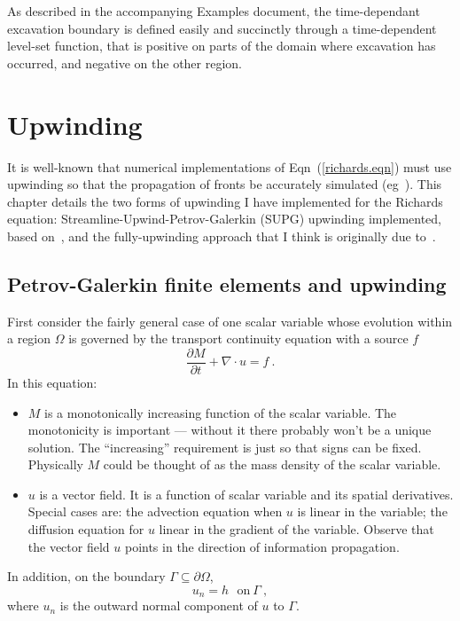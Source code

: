 \documentclass[]{scrreprt}
\begin{document}
As described in the accompanying Examples document, the time-dependant
excavation boundary is defined easily and succinctly through a time-dependent
level-set function, that is positive on parts of the domain where
excavation has occurred, and negative on the other region.




\chapter{Upwinding}
\label{chap.upwinding}

It is well-known that numerical implementations of
Eqn~(\ref{richards.eqn}) must use upwinding so that the propagation of
fronts be accurately simulated
(eg~\cite{huyakorn1978,dalen1979,helmig1998}).  This chapter details
the two forms of upwinding I have implemented for the Richards
equation: Streamline-Upwind-Petrov-Galerkin (SUPG) upwinding
implemented, based on~\cite{brooks1982, hughes1986}, and the
fully-upwinding approach that I think is originally due to~\cite{dalen1979}.

\section{Petrov-Galerkin finite elements and upwinding}

First consider the
fairly general case of one scalar variable whose evolution within a
region $\Omega$ is governed
by the transport continuity equation with a source $f$
\begin{equation}
\frac{\partial M}{\partial t} + \nabla\cdot u = f \ .
\label{eqn.continuity}
\end{equation}
In this equation:
\begin{itemize}
\item $M$ is a monotonically increasing function of the scalar variable.  The
  monotonicity is important --- without it there probably won't be a
  unique solution.  The ``increasing'' requirement is just so that
  signs can be fixed.   Physically $M$ could be thought of as the mass
  density of the scalar variable.
\item $u$ is a vector field.  It is a function of scalar variable and its
  spatial derivatives.  Special cases are: the advection equation when
  $u$ is linear in the variable; the diffusion equation for $u$ linear
  in the gradient of the variable.  Observe that the vector field $u$
  points in the direction of information propagation.
\end{itemize}
In addition, on the boundary $\Gamma \subseteq \partial\Omega$,
\begin{equation}
u_{n} = h \ \ \ \mbox{on}\ \Gamma \ ,
\end{equation}
where $u_{n}$ is the outward normal component of $u$ to $\Gamma$.
\end{document}
